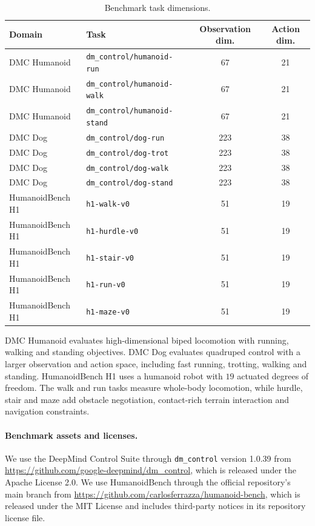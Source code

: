 \documentclass[11pt]{article}
\begin{document}
\begin{table}[H]
  \centering
  \footnotesize
  \setlength{\tabcolsep}{5.0pt}
  \caption{Benchmark task dimensions.}
  \label{tab:env_task_dims}
  \begin{tabular}{llcc}
    \toprule
    Domain & Task & Observation dim. & Action dim. \\
    \midrule
    DMC Humanoid & \texttt{dm\_control/humanoid-run} & 67 & 21 \\
    DMC Humanoid & \texttt{dm\_control/humanoid-walk} & 67 & 21 \\
    DMC Humanoid & \texttt{dm\_control/humanoid-stand} & 67 & 21 \\
    DMC Dog & \texttt{dm\_control/dog-run} & 223 & 38 \\
    DMC Dog & \texttt{dm\_control/dog-trot} & 223 & 38 \\
    DMC Dog & \texttt{dm\_control/dog-walk} & 223 & 38 \\
    DMC Dog & \texttt{dm\_control/dog-stand} & 223 & 38 \\
    HumanoidBench H1 & \texttt{h1-walk-v0} & 51 & 19 \\
    HumanoidBench H1 & \texttt{h1-hurdle-v0} & 51 & 19 \\
    HumanoidBench H1 & \texttt{h1-stair-v0} & 51 & 19 \\
    HumanoidBench H1 & \texttt{h1-run-v0} & 51 & 19 \\
    HumanoidBench H1 & \texttt{h1-maze-v0} & 51 & 19 \\
    \bottomrule
  \end{tabular}
\end{table}

DMC Humanoid evaluates high-dimensional biped locomotion with running, walking and standing objectives. DMC Dog evaluates quadruped control with a larger observation and action space, including fast running, trotting, walking and standing. HumanoidBench H1 uses a humanoid robot with $19$ actuated degrees of freedom. The walk and run tasks measure whole-body locomotion, while hurdle, stair and maze add obstacle negotiation, contact-rich terrain interaction and navigation constraints.

\paragraph{Benchmark assets and licenses.}
We use the DeepMind Control Suite through \texttt{dm\_control} version 1.0.39 from \url{https://github.com/google-deepmind/dm_control}, which is released under the Apache License 2.0. We use HumanoidBench through the official repository's main branch from \url{https://github.com/carlosferrazza/humanoid-bench}, which is released under the MIT License and includes third-party notices in its repository license file.
\end{document}
